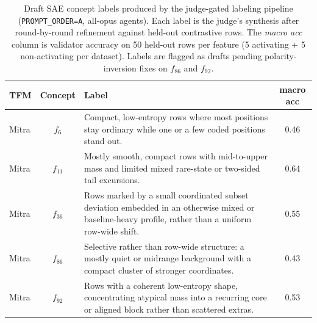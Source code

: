 \begin{table}[h]
\centering
\small
\caption{Draft SAE concept labels produced by the judge-gated labeling pipeline (\texttt{PROMPT\_ORDER=A}, all-opus agents). Each label is the judge's synthesis after round-by-round refinement against held-out contrastive rows. The \emph{macro acc} column is validator accuracy on 50 held-out rows per feature (5 activating + 5 non-activating per dataset). Labels are flagged as drafts pending polarity-inversion fixes on $f_{86}$ and $f_{92}$.}
\label{tab:concept_labels}
\begin{tabular}{l c p{10cm} c}
\toprule
TFM & Concept & Label & macro acc \\
\midrule
Mitra & $f_{6}$ & Compact, low-entropy rows where most positions stay ordinary while one or a few coded positions stand out. & 0.46 \\
Mitra & $f_{11}$ & Mostly smooth, compact rows with mid-to-upper mass and limited mixed rare-state or two-sided tail excursions. & 0.64 \\
Mitra & $f_{36}$ & Rows marked by a small coordinated subset deviation embedded in an otherwise mixed or baseline-heavy profile, rather than a uniform row-wide shift. & 0.55 \\
Mitra & $f_{86}$ & Selective rather than row-wide structure: a mostly quiet or midrange background with a compact cluster of stronger coordinates. & 0.43 \\
Mitra & $f_{92}$ & Rows with a coherent low-entropy shape, concentrating atypical mass into a recurring core or aligned block rather than scattered extras. & 0.53 \\
\bottomrule
\end{tabular}
\end{table}
